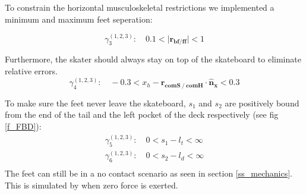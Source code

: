\documentclass[default,iicol]{sn-jnl}
\begin{document}
To constrain the horizontal musculoskeletal restrictions we implemented a minimum and maximum feet seperation:

\begin{equation}
        \gamma_{3}^{(1,2,3)}:\quad   0.1 < \vert \mathbf{r_{bf/ff}} \vert < 1
\end{equation}

Furthermore, the skater should always stay on top of the skateboard to eliminate relative errors.
\begin{equation}
    \gamma_4^{(1,2,3)}:\quad  -0.3 < x_h - \mathbf{r_{comS\mathbin{/}comH}}\cdot \mathbf{\hat n_x} < 0.3
\end{equation}

To make sure the feet never leave the skateboard, $s_1$ and $s_2$ are positively bound from the end of the tail and the left pocket of the deck respectively (see fig \ref{f_FBD}):
\begin{equation}
\begin{array}{c}
    \gamma_{5}^{(1,2,3)}:\quad  0 < s_1-l_t < \infty  \\
    \gamma_{6}^{(1,2,3)}:\quad  0 < s_2-l_d < \infty  \\
\end{array}
\end{equation}
The feet can still be in a no contact scenario as seen in section \ref{ss_mechanics}. This is simulated by when zero force is exerted. 
\end{document}
